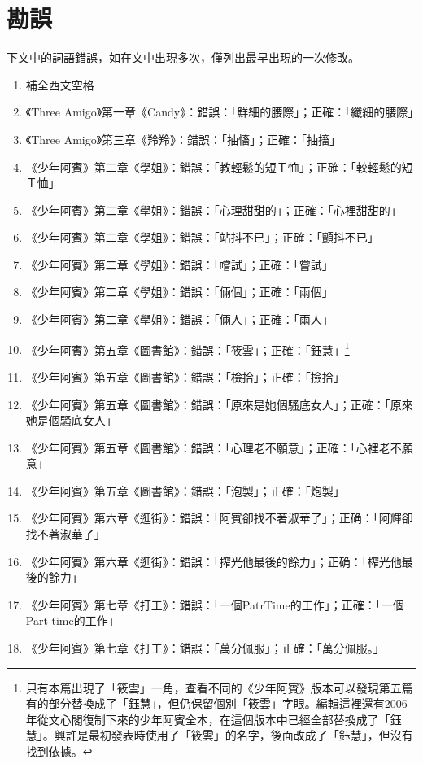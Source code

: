 \chapter*{勘誤}
下文中的詞語錯誤，如在文中出現多次，僅列出最早出現的一次修改。
\begin{enumerate}
\item 補全西文空格
\item 《Three Amigo》第一章《Candy》：錯誤：「鮮細的腰際」；正確：「纖細的腰際」
\item 《Three Amigo》第三章《羚羚》：錯誤：「抽慉」；正確：「抽搐」
\item 《少年阿賓》第二章《學姐》：錯誤：「教輕鬆的短Ｔ恤」；正確：「較輕鬆的短Ｔ恤」
\item 《少年阿賓》第二章《學姐》：錯誤：「心理甜甜的」；正確：「心裡甜甜的」
\item 《少年阿賓》第二章《學姐》：錯誤：「站抖不已」；正確：「顫抖不已」
\item 《少年阿賓》第二章《學姐》：錯誤：「嚐試」；正確：「嘗試」
\item 《少年阿賓》第二章《學姐》：錯誤：「倆個」；正確：「兩個」
\item 《少年阿賓》第二章《學姐》：錯誤：「倆人」；正確：「兩人」
\item 《少年阿賓》第五章《圖書館》：錯誤：「筱雲」；正確：「鈺慧」\footnote{只有本篇出現了「筱雲」一角，查看不同的《少年阿賓》版本可以發現第五篇有的部分替換成了「鈺慧」，但仍保留個別「筱雲」字眼。編輯這裡還有2006年從文心閣復制下來的少年阿賓全本，在這個版本中已經全部替換成了「鈺慧」。興許是最初發表時使用了「筱雲」的名字，後面改成了「鈺慧」，但沒有找到依據。}
\item 《少年阿賓》第五章《圖書館》：錯誤：「檢拾」；正確：「撿拾」
\item 《少年阿賓》第五章《圖書館》：錯誤：「原來是她個騷底女人」；正確：「原來她是個騷底女人」
\item 《少年阿賓》第五章《圖書館》：錯誤：「心理老不願意」；正確：「心裡老不願意」
\item《少年阿賓》第五章《圖書館》：錯誤：「泡製」；正確：「炮製」
\item 《少年阿賓》第六章《逛街》：錯誤：「阿賓卻找不著淑華了」；正确：「阿輝卻找不著淑華了」
\item 《少年阿賓》第六章《逛街》：錯誤：「搾光他最後的餘力」；正确：「榨光他最後的餘力」
\item 《少年阿賓》第七章《打工》：錯誤：「一個PatrTime的工作」；正確：「一個Part-time的工作」
\item 《少年阿賓》第七章《打工》：錯誤：「萬分佩服」；正確：「萬分佩服。」

\end{enumerate}
